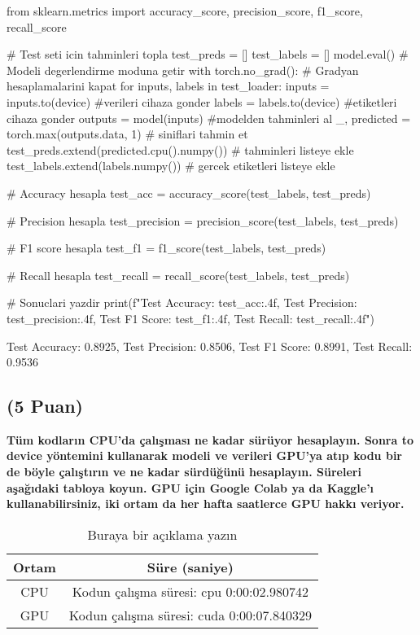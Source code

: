 \documentclass[11pt]{article}
\begin{document}
\begin{python}
from sklearn.metrics import accuracy_score, precision_score, f1_score, recall_score

# Test seti icin tahminleri topla
test_preds = []
test_labels = []
model.eval() # Modeli degerlendirme moduna getir
with torch.no_grad(): # Gradyan hesaplamalarini kapat
    for inputs, labels in test_loader:
        inputs = inputs.to(device) #verileri cihaza gonder
        labels = labels.to(device) #etiketleri cihaza gonder
        outputs = model(inputs) #modelden tahminleri al
        _, predicted = torch.max(outputs.data, 1) # siniflari tahmin et 
        test_preds.extend(predicted.cpu().numpy()) # tahminleri listeye ekle
        test_labels.extend(labels.numpy()) # gercek etiketleri listeye ekle
        

# Accuracy hesapla
test_acc = accuracy_score(test_labels, test_preds)

# Precision hesapla
test_precision = precision_score(test_labels, test_preds)

# F1 score hesapla
test_f1 = f1_score(test_labels, test_preds)

# Recall hesapla
test_recall = recall_score(test_labels, test_preds)

# Sonuclari yazdir
print(f"Test Accuracy: {test_acc:.4f}, Test Precision: {test_precision:.4f}, Test F1 Score: {test_f1:.4f}, Test Recall: {test_recall:.4f}")


\end{python}

Test Accuracy: 0.8925, Test Precision: 0.8506, Test F1 Score: 0.8991, Test Recall: 0.9536

\subsection{(5 Puan)} \textbf{Tüm kodların CPU'da çalışması ne kadar sürüyor hesaplayın. Sonra to device yöntemini kullanarak modeli ve verileri GPU'ya atıp kodu bir de böyle çalıştırın ve ne kadar sürdüğünü hesaplayın. Süreleri aşağıdaki tabloya koyun. GPU için Google Colab ya da Kaggle'ı kullanabilirsiniz, iki ortam da her hafta saatlerce GPU hakkı veriyor.}

\begin{table}[ht!]
    \centering
    \caption{Buraya bir açıklama yazın}
    \begin{tabular}{c|c}
        Ortam & Süre (saniye) \\\hline
        CPU & Kodun çalışma süresi: cpu  0:00:02.980742\\
        GPU & Kodun çalışma süresi: cuda  0:00:07.840329\\
    \end{tabular}
    \label{tab:my_table}
\end{table}
\end{document}

